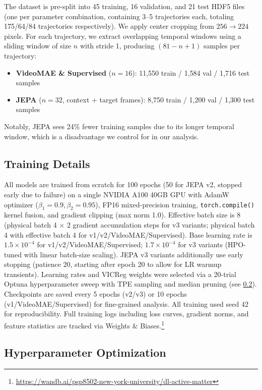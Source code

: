 \documentclass{article}
\begin{document}
The dataset is pre-split into 45 training, 16 validation, and 21 test HDF5 files (one per parameter combination, containing 3--5 trajectories each, totaling 175/64/84 trajectories respectively). We apply center cropping from $256 \to 224$ pixels. For each trajectory, we extract overlapping temporal windows using a sliding window of size $n$ with stride 1, producing $(81 - n + 1)$ samples per trajectory:
\begin{itemize}
    \item \textbf{VideoMAE \& Supervised} ($n{=}16$): 11{,}550 train / 1{,}584 val / 1{,}716 test samples
    \item \textbf{JEPA} ($n{=}32$, context + target frames): 8{,}750 train / 1{,}200 val / 1{,}300 test samples
\end{itemize}
Notably, JEPA sees 24\% fewer training samples due to its longer temporal window, which is a disadvantage we control for in our analysis.

\subsection{Training Details}

All models are trained from scratch for 100 epochs (50 for JEPA v2, stopped early due to failure) on a single NVIDIA A100 40GB GPU with AdamW optimizer ($\beta_1{=}0.9, \beta_2{=}0.95$), FP16 mixed-precision training, \texttt{torch.compile()} kernel fusion, and gradient clipping (max norm 1.0). Effective batch size is 8 (physical batch 4 $\times$ 2 gradient accumulation steps for v3 variants; physical batch 4 with effective batch 4 for v1/v2/VideoMAE/Supervised). Base learning rate is $1.5{\times}10^{-4}$ for v1/v2/VideoMAE/Supervised; $1.7{\times}10^{-4}$ for v3 variants (HPO-tuned with linear batch-size scaling). JEPA v3 variants additionally use early stopping (patience 20, starting after epoch 20 to allow for LR warmup transients). Learning rates and VICReg weights were selected via a 20-trial Optuna hyperparameter sweep with TPE sampling and median pruning (see \cref{sec:hpo}). Checkpoints are saved every 5 epochs (v2/v3) or 10 epochs (v1/VideoMAE/Supervised) for fine-grained analysis. All training used seed 42 for reproducibility. Full training logs including loss curves, gradient norms, and feature statistics are tracked via Weights \& Biases.\footnote{\url{https://wandb.ai/psp8502-new-york-university/dl-active-matter}}

\subsection{Hyperparameter Optimization}
\label{sec:hpo}
\end{document}
